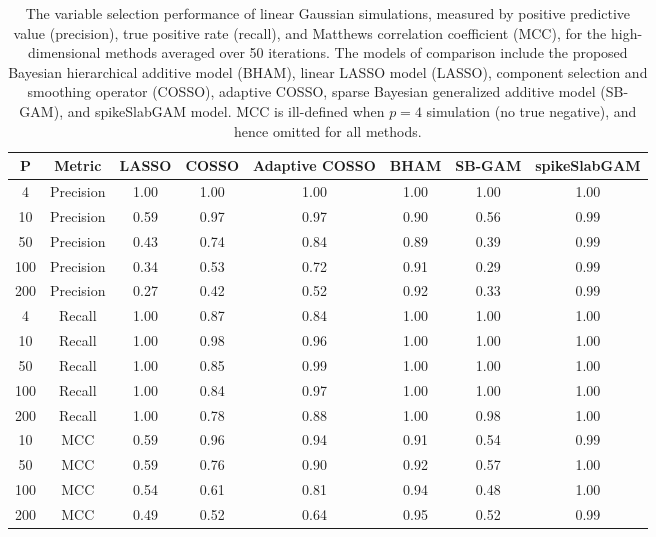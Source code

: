 \begin{table}[ht]
\centering
\begin{tabular}{cccccccc}
  \hline
P & Metric & LASSO & COSSO & Adaptive COSSO & BHAM & SB-GAM & spikeSlabGAM \\ 
  \hline
  4 & Precision & 1.00 & 1.00 & 1.00 & 1.00 & 1.00 & 1.00 \\ 
   10 & Precision & 0.59 & 0.97 & 0.97 & 0.90 & 0.56 & 0.99 \\ 
   50 & Precision & 0.43 & 0.74 & 0.84 & 0.89 & 0.39 & 0.99 \\ 
  100 & Precision & 0.34 & 0.53 & 0.72 & 0.91 & 0.29 & 0.99 \\ 
  200 & Precision & 0.27 & 0.42 & 0.52 & 0.92 & 0.33 & 0.99 \\ 
   \hline
  4 & Recall & 1.00 & 0.87 & 0.84 & 1.00 & 1.00 & 1.00 \\ 
   10 & Recall & 1.00 & 0.98 & 0.96 & 1.00 & 1.00 & 1.00 \\ 
   50 & Recall & 1.00 & 0.85 & 0.99 & 1.00 & 1.00 & 1.00 \\ 
  100 & Recall & 1.00 & 0.84 & 0.97 & 1.00 & 1.00 & 1.00 \\ 
  200 & Recall & 1.00 & 0.78 & 0.88 & 1.00 & 0.98 & 1.00 \\ 
   \hline
 10 & MCC & 0.59 & 0.96 & 0.94 & 0.91 & 0.54 & 0.99 \\ 
   50 & MCC & 0.59 & 0.76 & 0.90 & 0.92 & 0.57 & 1.00 \\ 
  100 & MCC & 0.54 & 0.61 & 0.81 & 0.94 & 0.48 & 1.00 \\ 
  200 & MCC & 0.49 & 0.52 & 0.64 & 0.95 & 0.52 & 0.99 \\ 
   \hline
\end{tabular}
\caption{The variable selection performance of linear Gaussian
                         simulations, measured by positive predictive value (precision),
                         true positive rate (recall), and Matthews correlation coefficient (MCC),
                         for the high-dimensional methods averaged over 50 iterations.
                         The models of comparison include the proposed Bayesian hierarchical additive model (BHAM),
                         linear LASSO model (LASSO), component selection and smoothing operator (COSSO),
                         adaptive COSSO, sparse Bayesian generalized additive model (SB-GAM), and spikeSlabGAM model.
                         MCC is ill-defined when $p=4$ simulation (no true negative), and hence omitted for all methods.} 
\label{tab:sim_lnr_gaus_var_select}
\end{table}
